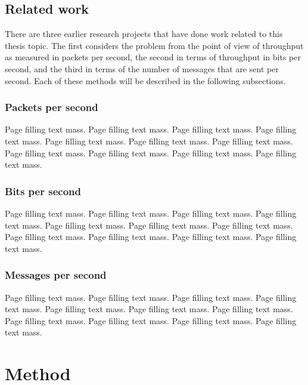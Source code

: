\documentclass[12pt,a4paper,twoside,openright]{book}
\begin{document}
\section{Related work}
\label{sec:related_work}

There are three earlier research projects that have done work related to this
thesis topic. The first considers the problem from the point of view of
throughput as measured in packets per second, the second in terms of
throughput in bits per second, and the third in terms of the number of
messages that are sent per second. Each of these methods will be described in
the following subsections.

\subsection{Packets per second}
\label{ssec:pps}

Page filling text mass. Page filling text mass. Page filling text mass. Page
filling text mass. Page filling text mass. Page filling text mass. Page
filling text mass. Page filling text mass. Page filling text mass. Page
filling text mass. Page filling text mass. 

\subsection{Bits per second}
\label{ssec:bps}

Page filling text mass. Page filling text mass. Page filling text mass. Page
filling text mass. Page filling text mass. Page filling text mass. Page
filling text mass. Page filling text mass. Page filling text mass. Page
filling text mass. Page filling text mass. 

\subsection{Messages per second}
\label{ssec:mps}

Page filling text mass. Page filling text mass. Page filling text mass. Page
filling text mass. Page filling text mass. Page filling text mass. Page
filling text mass. Page filling text mass. Page filling text mass. Page
filling text mass. Page filling text mass. 


\chapter{Method}
\label{chap:method}

\end{document}
